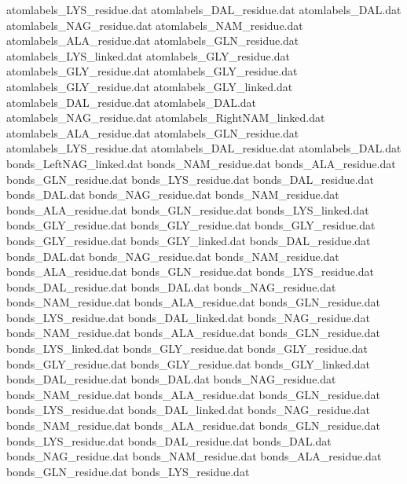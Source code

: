 atomlabels_LYS_residue.dat      
atomlabels_DAL_residue.dat      
atomlabels_DAL.dat              
atomlabels_NAG_residue.dat      
atomlabels_NAM_residue.dat      
atomlabels_ALA_residue.dat      
atomlabels_GLN_residue.dat      
atomlabels_LYS_linked.dat       
atomlabels_GLY_residue.dat
atomlabels_GLY_residue.dat
atomlabels_GLY_residue.dat
atomlabels_GLY_residue.dat
atomlabels_GLY_linked.dat
atomlabels_DAL_residue.dat      
atomlabels_DAL.dat              
atomlabels_NAG_residue.dat      
atomlabels_RightNAM_linked.dat  
atomlabels_ALA_residue.dat      
atomlabels_GLN_residue.dat      
atomlabels_LYS_residue.dat      
atomlabels_DAL_residue.dat      
atomlabels_DAL.dat              
bonds_LeftNAG_linked.dat        
bonds_NAM_residue.dat           
bonds_ALA_residue.dat           
bonds_GLN_residue.dat           
bonds_LYS_residue.dat           
bonds_DAL_residue.dat           
bonds_DAL.dat                   
bonds_NAG_residue.dat           
bonds_NAM_residue.dat           
bonds_ALA_residue.dat           
bonds_GLN_residue.dat           
bonds_LYS_linked.dat            
bonds_GLY_residue.dat
bonds_GLY_residue.dat
bonds_GLY_residue.dat
bonds_GLY_residue.dat
bonds_GLY_linked.dat
bonds_DAL_residue.dat           
bonds_DAL.dat                   
bonds_NAG_residue.dat           
bonds_NAM_residue.dat           
bonds_ALA_residue.dat           
bonds_GLN_residue.dat           
bonds_LYS_residue.dat           
bonds_DAL_residue.dat           
bonds_DAL.dat                   
bonds_NAG_residue.dat           
bonds_NAM_residue.dat           
bonds_ALA_residue.dat           
bonds_GLN_residue.dat           
bonds_LYS_residue.dat           
bonds_DAL_linked.dat            
bonds_NAG_residue.dat           
bonds_NAM_residue.dat           
bonds_ALA_residue.dat           
bonds_GLN_residue.dat           
bonds_LYS_linked.dat            
bonds_GLY_residue.dat
bonds_GLY_residue.dat
bonds_GLY_residue.dat
bonds_GLY_residue.dat
bonds_GLY_linked.dat
bonds_DAL_residue.dat           
bonds_DAL.dat                   
bonds_NAG_residue.dat           
bonds_NAM_residue.dat           
bonds_ALA_residue.dat           
bonds_GLN_residue.dat           
bonds_LYS_residue.dat           
bonds_DAL_linked.dat            
bonds_NAG_residue.dat           
bonds_NAM_residue.dat           
bonds_ALA_residue.dat           
bonds_GLN_residue.dat           
bonds_LYS_residue.dat           
bonds_DAL_residue.dat           
bonds_DAL.dat                   
bonds_NAG_residue.dat           
bonds_NAM_residue.dat           
bonds_ALA_residue.dat           
bonds_GLN_residue.dat           
bonds_LYS_residue.dat           
